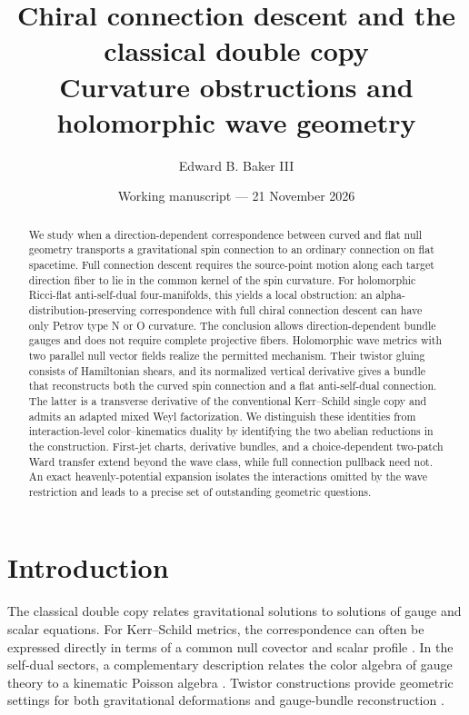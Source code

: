 \documentclass[11pt]{article}
\title{Chiral connection descent and the classical double copy\\[4pt]
\large Curvature obstructions and holomorphic wave geometry}
\author{Edward B. Baker III}
\date{Working manuscript --- 21 November 2026}
\numberwithin{equation}{section}
\theoremstyle{definition}
\theoremstyle{remark}
\begin{document}
\maketitle
\thispagestyle{plain}

\begin{abstract}
We study when a direction-dependent correspondence between curved and flat null geometry transports a gravitational spin connection to an ordinary connection on flat spacetime. Full connection descent requires the source-point motion along each target direction fiber to lie in the common kernel of the spin curvature. For holomorphic Ricci-flat anti-self-dual four-manifolds, this yields a local obstruction: an alpha-distribution-preserving correspondence with full chiral connection descent can have only Petrov type N or O curvature. The conclusion allows direction-dependent bundle gauges and does not require complete projective fibers. Holomorphic wave metrics with two parallel null vector fields realize the permitted mechanism. Their twistor gluing consists of Hamiltonian shears, and its normalized vertical derivative gives a bundle that reconstructs both the curved spin connection and a flat anti-self-dual connection. The latter is a transverse derivative of the conventional Kerr--Schild single copy and admits an adapted mixed Weyl factorization. We distinguish these identities from interaction-level color--kinematics duality by identifying the two abelian reductions in the construction. First-jet charts, derivative bundles, and a choice-dependent two-patch Ward transfer extend beyond the wave class, while full connection pullback need not. An exact heavenly-potential expansion isolates the interactions omitted by the wave restriction and leads to a precise set of outstanding geometric questions.
\end{abstract}

\tableofcontents

\section{Introduction}

The classical double copy relates gravitational solutions to solutions of gauge and scalar equations. For Kerr--Schild metrics, the correspondence can often be expressed directly in terms of a common null covector and scalar profile \cite{MOW}. In the self-dual sectors, a complementary description relates the color algebra of gauge theory to a kinematic Poisson algebra \cite{MO}. Twistor constructions provide geometric settings for both gravitational deformations and gauge-bundle reconstruction \cite{Penrose,Ward,CNW,Borsten}.
\end{document}
